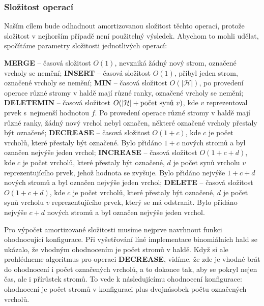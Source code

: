 \documentclass[a4paper,12pt]{article}
\begin{document}
\subsubsection{Složitost operací}

Naším cílem bude odhadnout amortizovanou složitost těchto 
operací, protože složitost v nejhorším případě není 
použitelný výsledek.  Abychom to mohli udělat, spočítáme parametry 
složitosti jednotlivých operací:  

{\bf MERGE} -- časová složitost $O(1)$, nevzniká žádný 
nový strom, 
ozna\-če\-né vrcholy se nemění;\newline 
{\bf INSERT} -- časová složitost $O(1)$, přibyl jeden strom, 
označené vrcholy se nemění;\newline 
{\bf MIN} -- časová složitost $O(|\mathcal H|)$, po provedení operace 
různé stro\-my v haldě mají různé 
ranky, označené vrcholy se nemění;\newline 
{\bf DELETEMIN} -- časová složitost $O(|\mathcal H|+\text{\rm počet synů }
v)$,
kde $v$ reprezentoval prvek s~nej\-menší hodnotou $f$. Po 
provedení ope\-ra\-ce různé stromy v haldě mají 
různé ranky, žádný nový vrchol nebyl 
označen, některé označené vrcholy přestaly být označené;\newline 
{\bf DECREASE} -- časová složitost $O(1+c)$, kde $c$ je počet 
vrcholů, které přestaly být označené. 
Bylo přidáno $1+c$ nových stromů a byl označen 
nejvýše jeden vrchol;\newline 
{\bf INCREASE} -- časová složitost $O(1+c+d)$, kde $c$ je počet 
vrcholů, které přestaly být označené, $d$ je 
počet synů vrcholu $v$ reprezentujícího prvek, 
jehož hodnota se zvyšuje. Bylo přidáno nejvýše $1
+c+d$ 
nových stromů a byl označen nejvýše jeden 
vrchol;\newline 
{\bf DELETE} -- časová složitost $O(1+c+d)$, kde $c$ je počet 
vrcholů, které přestaly být označené, $d$ je 
počet synů vrcholu $v$ reprezentujícího prvek, 
který se má odstranit. Bylo přidáno nejvýše $c+d$ 
nových stromů a byl označen nejvýše jeden 
vrchol.

Pro výpočet amortizované složitosti 
musíme nejprve navrhnout funkci ohodnocující 
konfigurace.  Při vyšetřování líné implementace binomiálních 
hald se ukázalo, že vhodným ohodnocením je počet stromů 
v haldě. Když si ale prohlédneme algoritmus pro operaci 
{\bf DECREASE}, vidíme, že zde je vhodné brát do ohodnocení i 
počet označených vrcholů, a to dokonce tak, aby 
se pokryl 
nejen čas, ale i přírůstek stromů. To vede k 
následujícímu ohodnocení konfigurace: ohodnocení je počet 
stromů v konfiguraci plus dvojnásobek počtu 
označených vrcholů.
\end{document}

